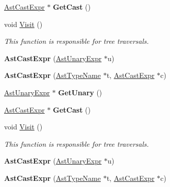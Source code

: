 \begin{DoxyCompactItemize}
\item 
\hypertarget{classAstCastExpr_a8f5626c4848927c8695c6f6893a3393b}{\hyperlink{classAstCastExpr}{Ast\-Cast\-Expr} $\ast$ {\bfseries Get\-Cast} ()}\label{classAstCastExpr_a8f5626c4848927c8695c6f6893a3393b}

\item 
void \hyperlink{classAstCastExpr_a5c0f13da0e4bd315eb0e56c9cc9635e9}{Visit} ()
\begin{DoxyCompactList}\small\item\em This function is responsible for tree traversals. \end{DoxyCompactList}\item 
\hypertarget{classAstCastExpr_a27857eebb48c3a153ddd4bebb0a5bc31}{{\bfseries Ast\-Cast\-Expr} (\hyperlink{classAstUnaryExpr}{Ast\-Unary\-Expr} $\ast$u)}\label{classAstCastExpr_a27857eebb48c3a153ddd4bebb0a5bc31}

\item 
\hypertarget{classAstCastExpr_a7a4384301ff0feb3c56fc6456792c416}{{\bfseries Ast\-Cast\-Expr} (\hyperlink{classAstTypeName}{Ast\-Type\-Name} $\ast$t, \hyperlink{classAstCastExpr}{Ast\-Cast\-Expr} $\ast$c)}\label{classAstCastExpr_a7a4384301ff0feb3c56fc6456792c416}

\item 
\hypertarget{classAstCastExpr_a85178306df5d2e1af2dca5a62ee2fab0}{\hyperlink{classAstUnaryExpr}{Ast\-Unary\-Expr} $\ast$ {\bfseries Get\-Unary} ()}\label{classAstCastExpr_a85178306df5d2e1af2dca5a62ee2fab0}

\item 
\hypertarget{classAstCastExpr_a8f5626c4848927c8695c6f6893a3393b}{\hyperlink{classAstCastExpr}{Ast\-Cast\-Expr} $\ast$ {\bfseries Get\-Cast} ()}\label{classAstCastExpr_a8f5626c4848927c8695c6f6893a3393b}

\item 
void \hyperlink{classAstCastExpr_a5c0f13da0e4bd315eb0e56c9cc9635e9}{Visit} ()
\begin{DoxyCompactList}\small\item\em This function is responsible for tree traversals. \end{DoxyCompactList}\item 
\hypertarget{classAstCastExpr_a27857eebb48c3a153ddd4bebb0a5bc31}{{\bfseries Ast\-Cast\-Expr} (\hyperlink{classAstUnaryExpr}{Ast\-Unary\-Expr} $\ast$u)}\label{classAstCastExpr_a27857eebb48c3a153ddd4bebb0a5bc31}

\item 
\hypertarget{classAstCastExpr_a7a4384301ff0feb3c56fc6456792c416}{{\bfseries Ast\-Cast\-Expr} (\hyperlink{classAstTypeName}{Ast\-Type\-Name} $\ast$t, \hyperlink{classAstCastExpr}{Ast\-Cast\-Expr} $\ast$c)}\label{classAstCastExpr_a7a4384301ff0feb3c56fc6456792c416}


\end{DoxyCompactItemize}
